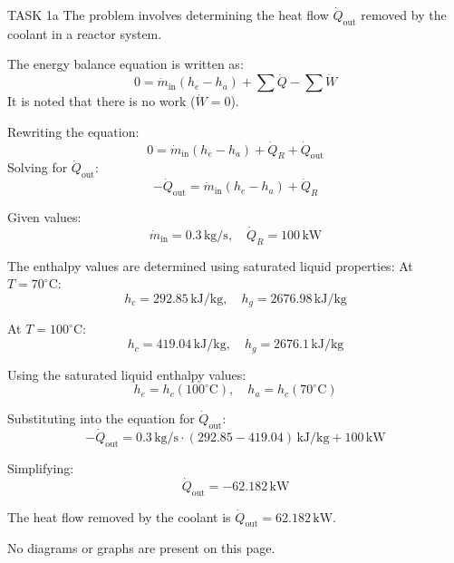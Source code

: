 TASK 1a  
The problem involves determining the heat flow \( \dot{Q}_{\text{out}} \) removed by the coolant in a reactor system.  

The energy balance equation is written as:  
\[
0 = \dot{m}_{\text{in}} (h_e - h_a) + \sum \dot{Q} - \sum \dot{W}
\]  
It is noted that there is no work (\( \dot{W} = 0 \)).  

Rewriting the equation:  
\[
0 = \dot{m}_{\text{in}} (h_e - h_a) + \dot{Q}_R + \dot{Q}_{\text{out}}
\]  
Solving for \( \dot{Q}_{\text{out}} \):  
\[
-\dot{Q}_{\text{out}} = \dot{m}_{\text{in}} (h_e - h_a) + \dot{Q}_R
\]  

Given values:  
\[
\dot{m}_{\text{in}} = 0.3 \, \text{kg/s}, \quad \dot{Q}_R = 100 \, \text{kW}
\]  

The enthalpy values are determined using saturated liquid properties:  
At \( T = 70^\circ\text{C} \):  
\[
h_c = 292.85 \, \text{kJ/kg}, \quad h_g = 2676.98 \, \text{kJ/kg}
\]  

At \( T = 100^\circ\text{C} \):  
\[
h_c = 419.04 \, \text{kJ/kg}, \quad h_g = 2676.1 \, \text{kJ/kg}
\]  

Using the saturated liquid enthalpy values:  
\[
h_e = h_c(100^\circ\text{C}), \quad h_a = h_c(70^\circ\text{C})
\]  

Substituting into the equation for \( \dot{Q}_{\text{out}} \):  
\[
-\dot{Q}_{\text{out}} = 0.3 \, \text{kg/s} \cdot (292.85 - 419.04) \, \text{kJ/kg} + 100 \, \text{kW}
\]  

Simplifying:  
\[
\dot{Q}_{\text{out}} = -62.182 \, \text{kW}
\]  

The heat flow removed by the coolant is \( \dot{Q}_{\text{out}} = 62.182 \, \text{kW} \).  

No diagrams or graphs are present on this page.